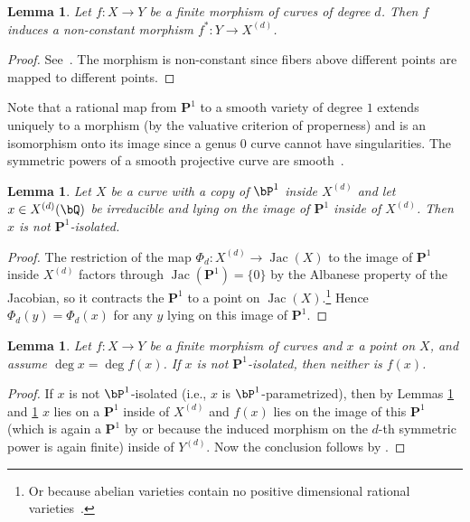 \documentclass[11pt,reqno]{amsart}
\theoremstyle{plain}
\newtheorem{lemma}[theorem]{Lemma}
\theoremstyle{definition}
\newcommand{\Q}{\bQ}
\newcommand{\PP}{\mathbf P}
\newcommand{\Jac}{\operatorname{Jac}}
\begin{document}
\begin{lemma} \label{lem:map to Symd}
Let $f\colon X \to Y$ be a finite morphism of curves of degree $d$. Then $f$ induces a non-constant morphism $f^*\colon Y \to X^{(d)}$.
\end{lemma}
\begin{proof}
    See~\cite[Theorem~3.13]{MilneJV}. The morphism is non-constant since fibers above different points are mapped to different points.
\end{proof}

Note that a rational map from $\PP^1$ to a smooth variety of degree $1$ extends uniquely to a morphism (by the valuative criterion of properness) and is an isomorphism onto its image since a genus $0$ curve cannot have singularities. The symmetric powers of a smooth projective curve are smooth~\cite[Proposition~3.2]{MilneJV}.

\begin{lemma} \label{lem:iso1}
Let $X$ be a curve with a copy of $\bP^1$ inside $X^{(d)}$ and let $x\in X^{(d)}(\Q)$ be irreducible and lying on the image of $\PP^1$ inside of $X^{(d)}$. Then $x$ is not $\PP^1$-isolated.
\end{lemma}
\begin{proof}
The restriction of the map $\Phi_d:X^{(d)}\rightarrow \Jac (X)$ to the image of $\PP^1$ inside $X^{(d)}$ factors through $\Jac(\PP^1)=\{0 \}$ by the Albanese property of the Jacobian, so it contracts the $\PP^1$ to a point on $\Jac(X)$.\footnote{Or because abelian varieties contain no positive dimensional rational varieties~\cite[Corollary~3.9]{MilneAV}.} Hence $\Phi_d(y) = \Phi_d(x)$ for any $y$ lying on this image of $\PP^1$.
\end{proof}

\begin{lemma} \label{lem:iso2}
Let $f: X\rightarrow Y$ be a finite morphism of curves and $x$ a point on $X$, and assume  $\deg x = \deg f(x)$. If $x$ is not $\PP^1$-isolated, then neither is $f(x)$.
\end{lemma}
\begin{proof}
If $x$ is not $\bP^1$-isolated (i.e., $x$ is $\bP^1$-parametrized), then
by Lemmas \ref{lem:iso1} and \ref{lem:iso2} $x$ lies on a $\PP^1$ inside of $X^{(d)}$ and $f(x)$ lies on the image of this $\PP^1$ (which is again a $\PP^1$ by  or because the induced morphism on the $d$-th symmetric power is again finite) inside of $Y^{(d)}$. Now the conclusion follows by .
\end{proof}
\end{document}

